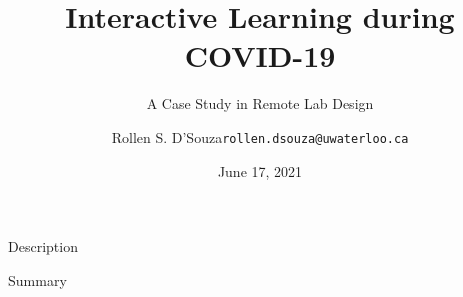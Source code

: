 \documentclass{beamer}
\title[Lab Design]{%
  Interactive Learning during COVID-19%
}
\subtitle{A Case Study in Remote Lab Design}
\author[R. S. D'Souza]{%
  Rollen S. D'Souza\newline\texttt{rollen.dsouza@uwaterloo.ca}
}
\date{June 17, 2021}
\begin{document}
\frame{\titlepage}

\begin{frame}{Description}
  
\end{frame}

\begin{frame}{Summary}

\end{frame}
\end{document}
